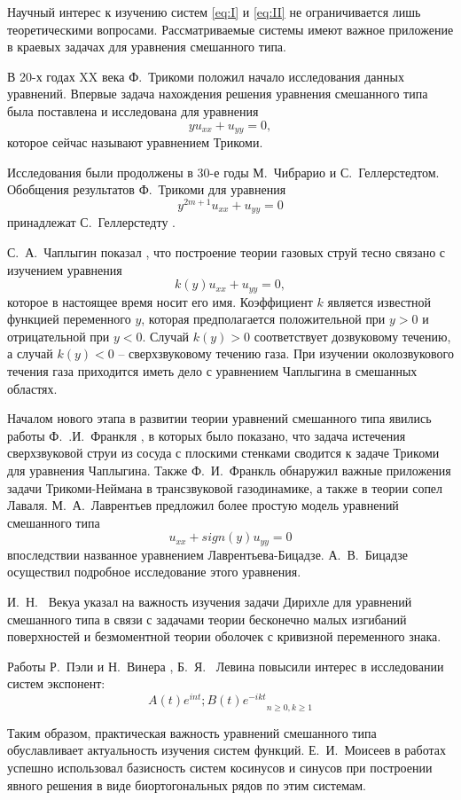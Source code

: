 ﻿\documentclass[oneside, final, 14pt]{extreport}
\begin{document}
Научный интерес к изучению систем \eqref{eq:I} и \eqref{eq:II} не ограничивается лишь 
теоретическими вопросами. Рассматриваемые системы имеют важное 
приложение в краевых задачах для уравнения смешанного типа.

В 20-х годах XX века Ф.~Трикоми \cite{trikomi} положил начало исследования данных уравнений. 
Впервые задача нахождения решения уравнения смешанного типа была поставлена и исследована для уравнения
$$yu_{xx} + u_{yy} = 0,$$
которое сейчас называют уравнением Трикоми.

Исследования были продолжены в 30-е годы М.~Чибрарио и С.~Геллерстедтом. 
Обобщения результатов Ф.~Трикоми для уравнения
$$y^{2m+1}u_{xx} + u_{yy} = 0$$
принадлежат С.~Геллерстедту \cite{gellerstedt}.

С.~А.~Чаплыгин показал \cite{chaplygin}, что построение теории газовых струй тесно
связано с изучением уравнения
$$k(y)u_{xx} + u_{yy} = 0,$$
которое в настоящее время носит его имя. Коэффициент $k$ является
известной функцией переменного $y$, которая предполагается положительной
при $y > 0$ и отрицательной при $y < 0$. Случай $k(y) > 0$ соответствует
дозвуковому течению, а случай $k(y) < 0$ – сверхзвуковому течению газа.
При изучении околозвукового течения газа приходится иметь дело с
уравнением Чаплыгина в смешанных областях.

Началом нового этапа в развитии теории уравнений смешанного типа
явились работы Ф.~.И.~Франкля \cite{frankl-laval, frankl-eq}, в которых было показано, что задача
истечения сверхзвуковой струи из сосуда с плоскими стенками сводится к
задаче Трикоми для уравнения Чаплыгина. Также Ф.~И.~Франкль обнаружил важные приложения задачи Трикоми-Неймана в трансзвуковой
газодинамике, а также в теории сопел Лаваля. М.~А.~Лаврентьев предложил \cite{lavrentiev-bitsadze} более
простую модель уравнений смешанного типа
$$u_{xx} + sign(y) u_{yy} = 0$$
впоследствии названное уравнением Лаврентьева-Бицадзе. А.~В.~Бицадзе 
осуществил подробное исследование этого уравнения.

И.~Н.~ Векуа указал \cite{vekua} на важность изучения задачи Дирихле для уравнений
смешанного типа в связи с задачами теории бесконечно малых изгибаний 
поверхностей и безмоментной теории оболочек с кривизной переменного
знака. 

Работы Р.~Пэли и Н.~Винера \cite{paley-wiener}, Б.~Я.~ Левина \cite{levin} повысили интерес в исследовании 
систем экспонент:
$${A(t)e^{int}; B(t)e^{-ikt}}_{n \geqslant 0, k \geqslant 1}$$

Таким образом, практическая важность уравнений смешанного типа обуславливает 
актуальность изучения систем функций. Е.~И.~Моисеев в работах \cite{moiseev-1990, moiseev-1996} успешно
использовал базисность систем косинусов и синусов при построении явного решения в виде
биортогональных рядов по этим системам. 
\end{document}
